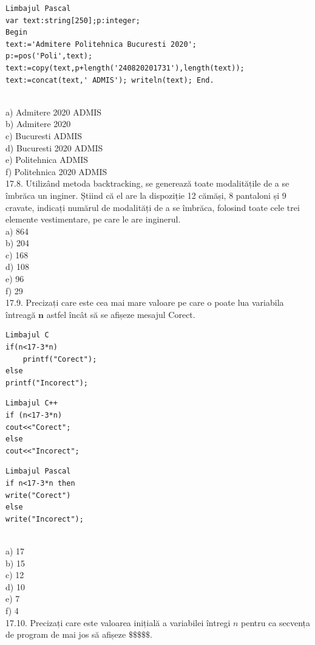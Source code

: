 {{\begin{verbatim}
Limbajul Pascal 
var text:string[250];p:integer; 
Begin 
text:='Admitere Politehnica Bucuresti 2020'; 
p:=pos('Poli',text); 
text:=copy(text,p+length('240820201731'),length(text)); 
text:=concat(text,' ADMIS'); writeln(text); End.
\end{verbatim}
\\
a) Admitere 2020 ADMIS
\\
b) Admitere 2020
\\
c) Bucuresti ADMIS
\\
d) Bucuresti 2020 ADMIS
\\
e) Politehnica ADMIS
\\
f) Politehnica 2020 ADMIS
\\
17.8. Utilizând metoda backtracking, se generează toate modalitățile de a se îmbrăca un inginer. Ș̦tiind că el are la dispoziție 12 cămăși, 8 pantaloni și 9 cravate, indicați numărul de modalități de a se îmbrăca, folosind toate cele trei elemente vestimentare, pe care le are inginerul.
\\
a) 864
\\
b) 204
\\
c) 168
\\
d) 108
\\
e) 96
\\
f) 29
\\
17.9. Precizați care este cea mai mare valoare pe care o poate lua variabila întreagă $\mathbf{n}$ astfel încât să se afișeze mesajul Corect.
\begin{verbatim}
Limbajul C
if(n<17-3*n)
    printf("Corect");
else
printf("Incorect");
\end{verbatim}
\begin{verbatim}
Limbajul C++
if (n<17-3*n)
cout<<"Corect";
else
cout<<"Incorect";
\end{verbatim}
\begin{verbatim}
Limbajul Pascal
if n<17-3*n then
write("Corect")
else
write("Incorect");
\end{verbatim}
\\
a) 17
\\
b) 15
\\
c) 12
\\
d) 10
\\
e) 7
\\
f) 4
\\
17.10. Precizați care este valoarea inițială a variabilei întregi $n$ pentru ca secvența de program de mai jos să afișeze $\mathbf{\$} \mathbf{\$} \mathbf{\$} \mathbf{\$}  \mathbf{\$}$.
\begin{verbatim}

\end{verbatim}}}
